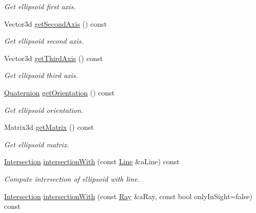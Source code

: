\begin{DoxyCompactItemize}
\begin{DoxyCompactList}\small\item\em Get ellipsoid first axis. \end{DoxyCompactList}\item 
Vector3d \hyperlink{classlibrary_1_1math_1_1geom_1_1d3_1_1objects_1_1_ellipsoid_a33dde96894c213da77ee116ff18fdf86}{get\+Second\+Axis} () const
\begin{DoxyCompactList}\small\item\em Get ellipsoid second axis. \end{DoxyCompactList}\item 
Vector3d \hyperlink{classlibrary_1_1math_1_1geom_1_1d3_1_1objects_1_1_ellipsoid_a12dc0fd72c672b3d78ec9a286db30c70}{get\+Third\+Axis} () const
\begin{DoxyCompactList}\small\item\em Get ellipsoid third axis. \end{DoxyCompactList}\item 
\hyperlink{classlibrary_1_1math_1_1geom_1_1d3_1_1trf_1_1rot_1_1_quaternion}{Quaternion} \hyperlink{classlibrary_1_1math_1_1geom_1_1d3_1_1objects_1_1_ellipsoid_a8d426da587827eff577de4edb58ae417}{get\+Orientation} () const
\begin{DoxyCompactList}\small\item\em Get ellipsoid orientation. \end{DoxyCompactList}\item 
Matrix3d \hyperlink{classlibrary_1_1math_1_1geom_1_1d3_1_1objects_1_1_ellipsoid_ae6af9f16762e8c38b0a71c306d29ddbf}{get\+Matrix} () const
\begin{DoxyCompactList}\small\item\em Get ellipsoid matrix. \end{DoxyCompactList}\item 
\hyperlink{classlibrary_1_1math_1_1geom_1_1d3_1_1_intersection}{Intersection} \hyperlink{classlibrary_1_1math_1_1geom_1_1d3_1_1objects_1_1_ellipsoid_a5a043a5a0ad0c68771902824c9ea0190}{intersection\+With} (const \hyperlink{classlibrary_1_1math_1_1geom_1_1d3_1_1objects_1_1_line}{Line} \&a\+Line) const
\begin{DoxyCompactList}\small\item\em Compute intersection of ellipsoid with line. \end{DoxyCompactList}\item 
\hyperlink{classlibrary_1_1math_1_1geom_1_1d3_1_1_intersection}{Intersection} \hyperlink{classlibrary_1_1math_1_1geom_1_1d3_1_1objects_1_1_ellipsoid_a2a7c282ac6d4b54210582953e37c8ab5}{intersection\+With} (const \hyperlink{classlibrary_1_1math_1_1geom_1_1d3_1_1objects_1_1_ray}{Ray} \&a\+Ray, const bool only\+In\+Sight=false) const

\end{DoxyCompactItemize}

